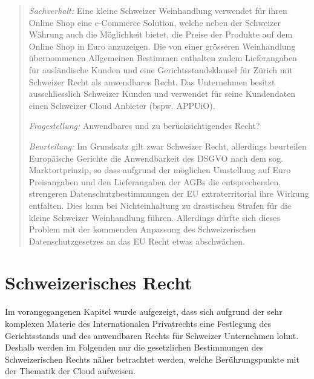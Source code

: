 \documentclass[a4paper,pointlessnumbers]{scrreprt}
\begin{document}
\begin{quote}
\textit{Sachverhalt:} Eine kleine Schweizer Weinhandlung verwendet für ihren Online Shop eine e-Commerce Solution, welche neben der Schweizer Währung auch die Möglichkeit bietet, die Preise der Produkte auf dem Online Shop in Euro anzuzeigen. Die von einer grösseren Weinhandlung übernommenen Allgemeinen Bestimmen enthalten zudem Lieferangaben für ausländische Kunden und eine Gerichtsstandsklausel für Zürich mit Schweizer Recht als anwendbares Recht. Das Unternehmen besitzt ausschliesslich Schweizer Kunden und verwendet für seine Kundendaten einen Schweizer Cloud Anbieter (bspw. APPUiO).

\textit{Fragestellung:} Anwendbares und zu berücksichtigendes Recht?

\textit{Beurteilung:} Im Grundsatz gilt zwar Schweizer Recht, allerdings beurteilen Europäische Gerichte die Anwendbarkeit des DSGVO nach dem sog. Marktortprinzip, so dass aufgrund der möglichen Umstellung auf Euro Preisangaben und den Lieferangaben der AGBs die entsprechenden, strengeren Datenschutzbestimmungen der EU extraterritorial ihre Wirkung entfalten. Dies kann bei Nichteinhaltung zu drastischen Strafen für die kleine Schweizer Weinhandlung führen. Allerdings dürfte sich dieses Problem mit der kommenden Anpassung des Schweizerischen Datenschutzgesetzes an das EU Recht etwas abschwächen.
\end{quote}


\chapter{Schweizerisches Recht}
Im vorangegangenen Kapitel wurde aufgezeigt, dass sich aufgrund der sehr komplexen Materie des Internationalen Privatrechts eine Festlegung des Gerichtsstands und des anwendbaren Rechts für Schweizer Unternehmen lohnt. Deshalb werden im Folgenden nur die gesetzlichen Bestimmungen des Schweizerischen Rechts näher betrachtet werden, welche Berührungspunkte mit der Thematik der Cloud aufweisen.
\end{document}
